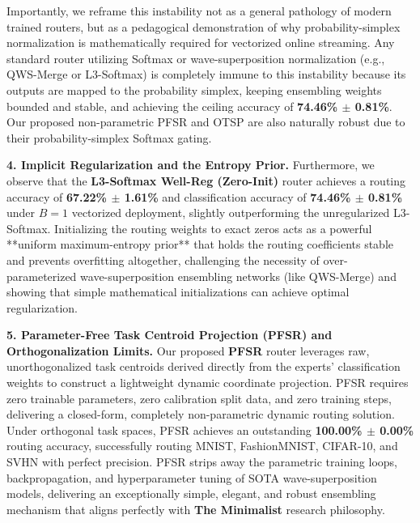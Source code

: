 Importantly, we reframe this instability not as a general pathology of modern trained routers, but as a pedagogical demonstration of why probability-simplex normalization is mathematically required for vectorized online streaming. Any standard router utilizing Softmax or wave-superposition normalization (e.g., QWS-Merge or L3-Softmax) is completely immune to this instability because its outputs are mapped to the probability simplex, keeping ensembling weights bounded and stable, and achieving the ceiling accuracy of \textbf{74.46\% $\pm$ 0.81\%}. Our proposed non-parametric PFSR and OTSP are also naturally robust due to their probability-simplex Softmax gating.

\textbf{4. Implicit Regularization and the Entropy Prior.}
Furthermore, we observe that the \textbf{L3-Softmax Well-Reg (Zero-Init)} router achieves a routing accuracy of \textbf{67.22\% $\pm$ 1.61\%} and classification accuracy of \textbf{74.46\% $\pm$ 0.81\%} under $B=1$ vectorized deployment, slightly outperforming the unregularized L3-Softmax. Initializing the routing weights to exact zeros acts as a powerful **uniform maximum-entropy prior** that holds the routing coefficients stable and prevents overfitting altogether, challenging the necessity of over-parameterized wave-superposition ensembling networks (like QWS-Merge) and showing that simple mathematical initializations can achieve optimal regularization.

\textbf{5. Parameter-Free Task Centroid Projection (PFSR) and Orthogonalization Limits.}
Our proposed \textbf{PFSR} router leverages raw, unorthogonalized task centroids derived directly from the experts' classification weights to construct a lightweight dynamic coordinate projection. PFSR requires zero trainable parameters, zero calibration split data, and zero training steps, delivering a closed-form, completely non-parametric dynamic routing solution. Under orthogonal task spaces, PFSR achieves an outstanding \textbf{100.00\% $\pm$ 0.00\%} routing accuracy, successfully routing MNIST, FashionMNIST, CIFAR-10, and SVHN with perfect precision. PFSR strips away the parametric training loops, backpropagation, and hyperparameter tuning of SOTA wave-superposition models, delivering an exceptionally simple, elegant, and robust ensembling mechanism that aligns perfectly with \textbf{The Minimalist} research philosophy.

